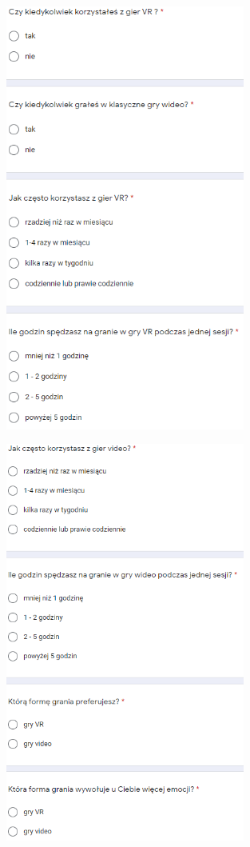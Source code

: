 \begin{figure}
	\centering
	\includegraphics[width=0.7\textwidth]{images/ankieta12.PNG}
\end{figure}
\begin{figure}
	\centering
	\includegraphics[width=0.7\textwidth]{images/ankieta123.PNG}
\end{figure}
